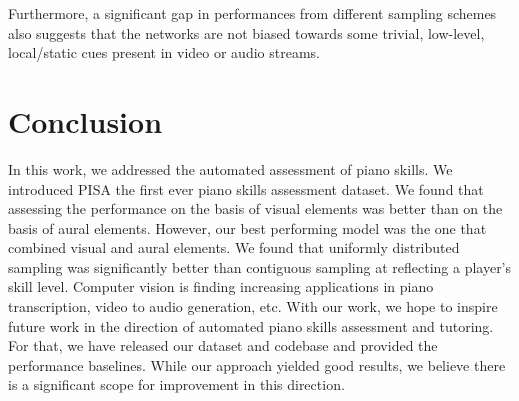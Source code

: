 \documentclass{article}
\begin{document}
Furthermore, a significant gap in performances from different sampling schemes also suggests that the networks are not biased towards some trivial, low-level, local/static cues present in video or audio streams. \section{Conclusion}
\label{sec:conclusion}
In this work, we addressed the automated assessment of piano skills. We introduced PISA the first ever piano skills assessment dataset. We found that assessing the performance on the basis of visual elements was better than on the basis of aural elements. However, our best performing model was the one that combined visual and aural elements. We found that uniformly distributed sampling was significantly better than contiguous sampling at reflecting a player's skill level. Computer vision is finding increasing applications in piano transcription, video to audio generation, etc. With our work, we hope to inspire future work in the direction of automated piano skills assessment and tutoring. For that, we have released our dataset and codebase and provided the performance baselines. While our approach yielded good results, we believe there is a significant scope for improvement in this direction. 



\end{document}
